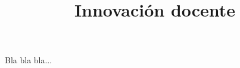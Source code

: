 \documentclass{article}
\title{Innovación docente}
\begin{document}
\maketitle
Bla bla bla...
\end{document}
